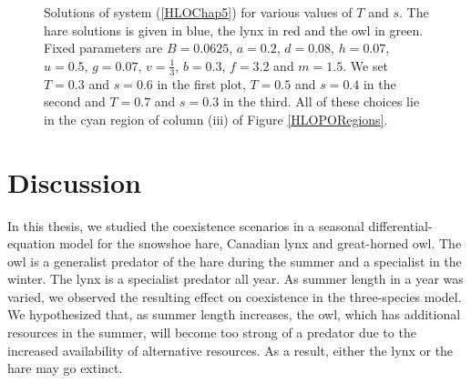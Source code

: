 \documentclass[12pt]{UOthesis}
\theoremstyle{remarkstyle}
\begin{document}
\begin{figure}[h!]
	\centering
	
	\caption[Solutions of the original system (periodic orbit)]{Solutions of system (\ref{HLOChap5}) for various values of $T$ and $s$. The hare solutions is given in blue, the lynx in red and the owl in green. Fixed parameters are $B=0.0625$, $a=0.2$, $d=0.08$, $h=0.07$, $u=0.5$, $g=0.07$, $v=\frac{1}{3}$, $b=0.3$, $f=3.2$ and $m=1.5$. We set $T=0.3$ and $s=0.6$ in the first plot, $T=0.5$ and $s=0.4$ in the second and $T=0.7$ and $s=0.3$ in the third. All of these choices lie in the cyan region of column (iii) of Figure \ref{HLOPORegions}.\label{HLOPOSolutions}}%
\end{figure}

\pagebreak

\chapter{Discussion}
\label{ChapterDiscussion}

In this thesis, we studied the coexistence scenarios in a seasonal differential-equation model for the snowshoe hare, Canadian lynx and great-horned owl. The owl is a generalist predator of the hare during the summer and a specialist in the winter. The lynx is a specialist predator all year. As summer length in a year was varied, we observed the resulting effect on coexistence in the three-species model. We hypothesized that, as summer length increases, the owl, which has additional resources in the summer, will become too strong of a predator due to the increased availability of  alternative resources. As a result, either the lynx or the hare may go extinct.\\
\end{document}
